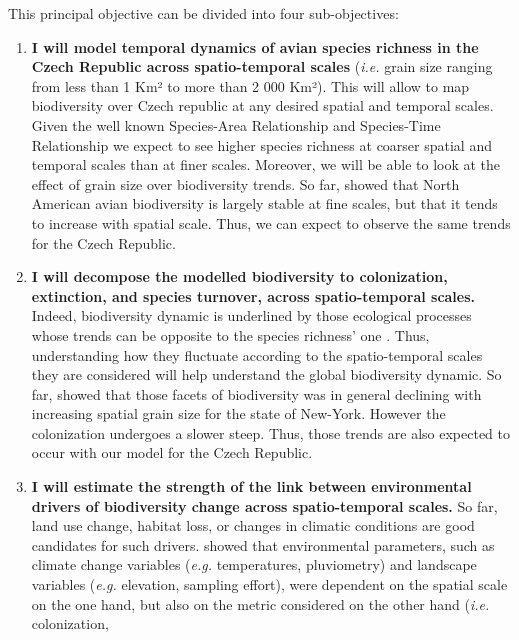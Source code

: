 \documentclass[
  12pt,
  oneside]{report}
\begin{document}
This principal objective can be divided into four sub-objectives:

\begin{enumerate}
\def\labelenumi{\arabic{enumi}.}
\item
  \textbf{I will model temporal dynamics of avian species richness in the Czech Republic across spatio-temporal scales} (\emph{i.e.} grain size ranging from less than 1 Km² to more than 2 000
  Km²). This will allow to map biodiversity over Czech republic at any desired spatial and
  temporal scales. Given the well known Species-Area Relationship \autocites[SAR,][]{arrhenius_species_1921}{storch_untangling_2004} and Species-Time Relationship \autocite[STR,][]{white_comparison_2006} we expect to
  see higher species richness at coarser spatial and temporal scales than at finer scales.
  Moreover, we will be able to look at the effect of grain size over biodiversity trends. So far,
  \textcite{chase_species_2019} showed that North American avian biodiversity is largely stable at fine
  scales, but that it tends to increase with spatial scale. Thus, we can expect to observe the same
  trends for the Czech Republic.
\item
  \textbf{I will decompose the modelled biodiversity to colonization, extinction, and species turnover, across spatio-temporal scales.} Indeed, biodiversity dynamic is underlined by
  those ecological processes whose trends can be opposite to the species richness' one \autocite{dornelas_assemblage_2014}. Thus, understanding how they fluctuate according to the spatio-temporal scales
  they are considered will help understand the global biodiversity dynamic. So far, \textcite{jarzyna_spatial_2015} showed that those facets of biodiversity was in general declining with increasing
  spatial grain size for the state of New-York. However the colonization undergoes a slower
  steep. Thus, those trends are also expected to occur with our model for the Czech Republic.
\item
  \textbf{I will estimate the strength of the link between environmental drivers of biodiversity change across spatio-temporal scales.} So far, land use change, habitat loss, or changes in
  climatic conditions are good candidates for such drivers. \textcite{jarzyna_spatial_2015} showed that
  environmental parameters, such as climate change variables (\emph{e.g.} temperatures, pluviometry)
  and landscape variables (\emph{e.g.} elevation, sampling effort), were dependent on the spatial scale
  on the one hand, but also on the metric considered on the other hand (\emph{i.e.} colonization,

\end{enumerate}
\end{document}
